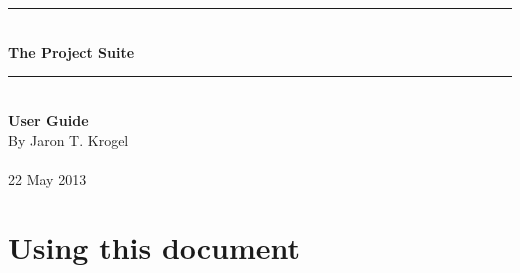 \documentclass[oneside,11pt]{memoir}
\numberwithin{equation}{section}
\newcommand{\HRule}{\rule{\linewidth}{0.5mm}}
\newenvironment{changemargin}[2]{%
\begin{list}{}{%
\setlength{\leftmargin}{#1}%
\setlength{\rightmargin}{#2}%
}%
\item[]}{\end{list}}
\begin{document}


\thispagestyle{empty}
\begin{changemargin}{-1cm}{-1cm}
  \begin{center}
    \hspace{1cm}\\
    \hspace{1cm}\\
    \hspace{1cm}\\
    \hspace{1cm}\\
    \hspace{1cm}\\
    \hspace{1cm}\\
    \hspace{1cm}\\
    \hspace{1cm}\\
    \hspace{1cm}\\
    \hspace{1cm}\\
    \hspace{1cm}\\
    \hspace{1cm}\\
    \HRule\\
    \vspace{4mm}
    \textbf{\fontsize{40}{45}\selectfont The Project Suite} \\ 
    \HRule\\
    \vspace{1cm}
    \textbf{\fontsize{35}{40}\selectfont User Guide}\\
    \vspace{6cm}
    By Jaron T. Krogel \\
    \hspace{1cm}\\
    22 May 2013
  \end{center}
\end{changemargin}
\pagebreak

\tableofcontents



\mainmatter

\pagebreak
\chapter{Using this document} \label{usedoc}
\end{document}
